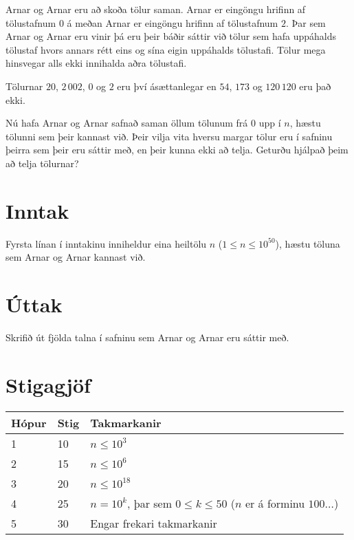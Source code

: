 %
Arnar og Arnar eru að skoða tölur saman.
Arnar er eingöngu hrifinn af tölustafnum $0$ á meðan Arnar er eingöngu hrifinn af tölustafnum $2$.
Þar sem Arnar og Arnar eru vinir þá eru þeir báðir sáttir við tölur sem hafa uppáhalds tölustaf
hvors annars rétt eins og sína eigin uppáhalds tölustafi.
Tölur mega hinsvegar alls ekki innihalda aðra tölustafi.

Tölurnar $20$, $2\,002$, $0$ og $2$ eru því ásættanlegar en $54$, $173$ og $120\,120$ eru það ekki.

Nú hafa Arnar og Arnar safnað saman öllum tölunum frá $0$ upp í $n$, hæstu tölunni sem þeir kannast við.
Þeir vilja vita hversu margar tölur eru í safninu þeirra sem þeir eru sáttir með, en þeir kunna ekki að telja.
Geturðu hjálpað þeim að telja tölurnar?

\section*{Inntak}
Fyrsta línan í inntakinu inniheldur eina heiltölu $n$ ($1 \leq n \leq
10^{50}$), hæstu töluna sem Arnar og Arnar kannast við.

\section*{Úttak}
Skrifið út fjölda talna í safninu sem Arnar og Arnar eru sáttir með.

\section*{Stigagjöf}
\begin{tabular}{|l|l|l|}
\hline
Hópur & Stig & Takmarkanir \\ \hline
1     & 10   & $n \leq 10^{3}$ \\ \hline
2     & 15   & $n \leq 10^{6}$ \\ \hline
3     & 20   & $n \leq 10^{18}$\\ \hline
4     & 25   & $n = 10^{k}$, þar sem $0 \leq k \leq 50$ ($n$ er á forminu $100\dots$) \\ \hline
5     & 30   & Engar frekari takmarkanir\\ \hline
\end{tabular}

